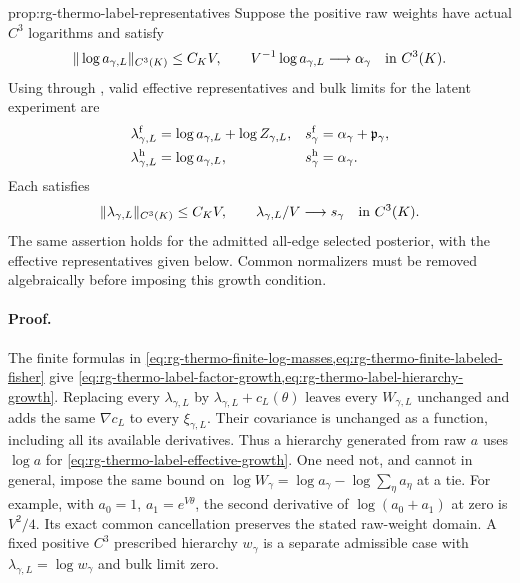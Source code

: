 {prop:rg-thermo-label-representatives}
Suppose the positive raw weights have actual $C^3$ logarithms and satisfy
\begin{equation}
 \|\log a_{\gamma,L}\|_{C^3(K)}\leq C_KV,
 \qquad V^{-1}\log a_{\gamma,L}\longrightarrow\alpha_\gamma
                  \quad\hbox{in }C^3(K).
 \label{eq:rg-thermo-label-raw-growth}
\end{equation}
Using  through
, valid effective representatives
and bulk limits for the latent experiment are
\begin{align}
 \lambda_{\gamma,L}^{\rm f}
 &=\log a_{\gamma,L}+\log Z_{\gamma,L},
 &s_\gamma^{\rm f}&=\alpha_\gamma+\mathfrak p_\gamma,\label{eq:rg-thermo-label-factor-growth}\\
 \lambda_{\gamma,L}^{\rm h}
 &=\log a_{\gamma,L},
 &s_\gamma^{\rm h}&=\alpha_\gamma.\label{eq:rg-thermo-label-hierarchy-growth}
\end{align}
Each satisfies
\begin{equation}
 \|\lambda_{\gamma,L}\|_{C^3(K)}\leq C_KV,
 \qquad \lambda_{\gamma,L}/V\longrightarrow s_\gamma
                                      \quad\hbox{in }C^3(K).
 \label{eq:rg-thermo-label-effective-growth}
\end{equation}
The same assertion holds for the admitted all-edge selected posterior,
with the effective representatives given below. Common normalizers must
be removed algebraically before imposing this growth condition.\thermoestablishedstatus


\paragraph{Proof.}
The finite formulas in
\cref{eq:rg-thermo-finite-log-masses,eq:rg-thermo-finite-labeled-fisher}
give \cref{eq:rg-thermo-label-factor-growth,eq:rg-thermo-label-hierarchy-growth}.
Replacing every $\lambda_{\gamma,L}$ by
$\lambda_{\gamma,L}+c_L(\theta)$ leaves every $W_{\gamma,L}$ unchanged
and adds the same $\nabla c_L$ to every $\xi_{\gamma,L}$. Their covariance
is unchanged as a function, including all its available derivatives.
Thus a hierarchy generated from raw $a$ uses $\log a$ for
\cref{eq:rg-thermo-label-effective-growth}. One need not, and cannot in
general, impose the same bound on
$\log W_\gamma=\log a_\gamma-\log\sum_\eta a_\eta$ at a tie.
For example, with $a_0=1$, $a_1=e^{V\theta}$, the second derivative of
$\log(a_0+a_1)$ at zero is $V^2/4$. Its exact common cancellation
preserves the stated raw-weight domain. A fixed positive $C^3$
prescribed hierarchy $w_\gamma$ is a separate admissible case with
$\lambda_{\gamma,L}=\log w_\gamma$ and bulk limit zero.

